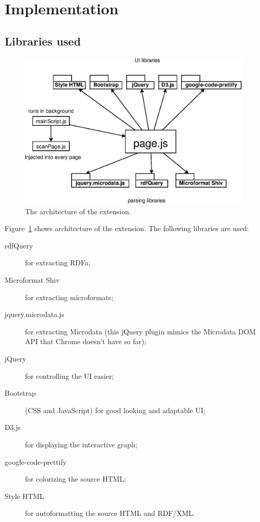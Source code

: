 \documentclass[12pt]{article}
\begin{document}
\section{Implementation}

\subsection{Libraries used}

\begin{figure}[b!]
    \centering
    \includegraphics[width=13cm]{diagram}
    \caption{The architecture of the extension.}
    \label{sysArch}
\end{figure}

Figure~\ref{sysArch} shows architecture of the extension. The following
libraries are used:

\begin{description}
    \item[rdfQuery] for extracting RDFa;
    \item[Microformat Shiv] for extracting microformats;
    \item[jquery.microdata.js] for extracting Microdata (this jQuery plugin
    mimics the Microdata DOM API that Chrome doesn't have so far);
    \item[jQuery] for controlling the UI easier;
    \item[Bootstrap] (CSS and JavaScript) for good looking and adaptable UI;
    \item[D3.js] for displaying the interactive graph;
    \item[google-code-prettify] for colorizing the source HTML;
    \item[Style HTML] for autoformatting the source HTML and RDF/XML.
\end{description}
\end{document}
